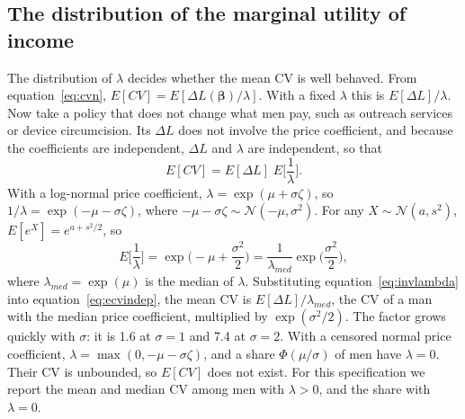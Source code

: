 \documentclass[11pt]{article}
\numberwithin{equation}{section}\numberwithin{figure}{section}\numberwithin{table}{section}
\begin{document}
\subsection{The distribution of the marginal utility of income}
The distribution of $\lambda$ decides whether the mean CV is well behaved. From equation~\ref{eq:cvn}, $E[CV] = E[\Delta L(\boldsymbol{\beta})/\lambda]$. With a fixed $\lambda$ this is $E[\Delta L]/\lambda$. Now take a policy that does not change what men pay, such as outreach services or device circumcision. Its $\Delta L$ does not involve the price coefficient, and because the coefficients are independent, $\Delta L$ and $\lambda$ are independent, so that
\begin{equation}\label{eq:ecvindep}
E[CV] = E[\Delta L]\; E\Big[\frac{1}{\lambda}\Big].
\end{equation}
With a log-normal price coefficient, $\lambda = \exp(\mu + \sigma\zeta)$, so $1/\lambda = \exp(-\mu - \sigma\zeta)$, where $-\mu - \sigma\zeta \sim \mathcal{N}(-\mu, \sigma^2)$. For any $X \sim \mathcal{N}(a, s^2)$, $E[e^X] = e^{a + s^2/2}$, so
\begin{equation}\label{eq:invlambda}
E\Big[\frac{1}{\lambda}\Big] = \exp\Big(-\mu + \frac{\sigma^2}{2}\Big) = \frac{1}{\lambda_{med}}\exp\Big(\frac{\sigma^2}{2}\Big),
\end{equation}
where $\lambda_{med} = \exp(\mu)$ is the median of $\lambda$. Substituting equation~\ref{eq:invlambda} into equation~\ref{eq:ecvindep}, the mean CV is $E[\Delta L]/\lambda_{med}$, the CV of a man with the median price coefficient, multiplied by $\exp(\sigma^2/2)$. The factor grows quickly with $\sigma$: it is 1.6 at $\sigma = 1$ and 7.4 at $\sigma = 2$. With a censored normal price coefficient, $\lambda = \max(0, -\mu - \sigma\zeta)$, and a share $\Phi(\mu/\sigma)$ of men have $\lambda = 0$. Their CV is unbounded, so $E[CV]$ does not exist.\cite{DalyHessTrain2012} For this specification we report the mean and median CV among men with $\lambda > 0$, and the share with $\lambda = 0$.
\end{document}
